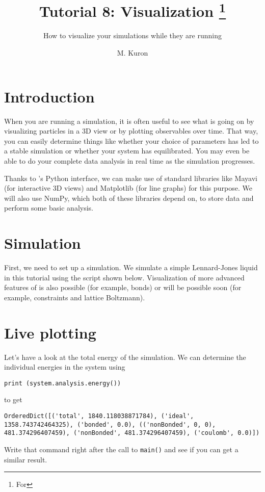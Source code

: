 \documentclass[
paper=a4,                       %
fontsize=11pt,                  %
twoside,                        %
footsepline,                    %
headsepline,                    %
headinclude=false,              %
footinclude=false,              %
pagesize,                       %
]{scrartcl}
\begin{document}
\esptitlehead

\title{Tutorial 8: Visualization%
\ifdefined\esversion%
\thanks{For \es \esversion}%
\fi%
}
\subtitle{How to visualize your \es simulations while they are running}
\author{M. Kuron}
\maketitle

\section{Introduction}
\label{intro}

When you are running a simulation, it is often useful to see what is going on by visualizing particles in a 3D view or by plotting observables over time.
That way, you can easily determine things like whether your choice of parameters has led to a stable simulation or whether your system has equilibrated.
You may even be able to do your complete data analysis in real time as the simulation progresses.

Thanks to \es's Python interface, we can make use of standard libraries like Mayavi (for interactive 3D views) and Matplotlib (for line graphs) for this purpose.
We will also use NumPy, which both of these libraries depend on, to store data and perform some basic analysis.

\section{Simulation}
\label{sim}

First, we need to set up a simulation.
We simulate a simple Lennard-Jones liquid in this tutorial using the script shown below.
Visualization of more advanced features of \es is also possible (for example, bonds) or will be possible soon (for example, constraints and lattice Boltzmann).



\section{Live plotting}
\label{plot}

Let's have a look at the total energy of the simulation.
We can determine the individual energies in the system using
\begin{lstlisting}
print (system.analysis.energy())
\end{lstlisting}
to get
\begin{lstlisting}
OrderedDict([('total', 1840.118038871784), ('ideal', 1358.743742464325), ('bonded', 0.0), (('nonBonded', 0, 0), 481.374296407459), ('nonBonded', 481.374296407459), ('coulomb', 0.0)])
\end{lstlisting}
Write that command right after the call to \lstinline{main()} and see if you can get a similar result.
\end{document}
